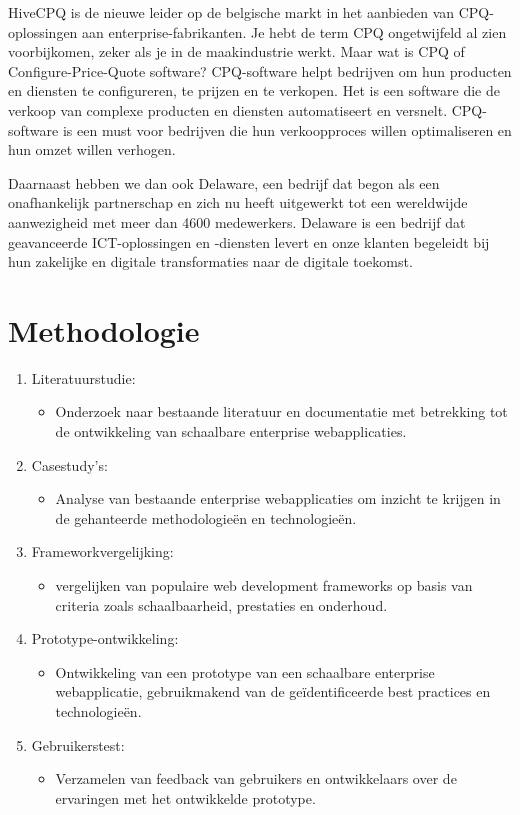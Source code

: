 \documentclass{hogent-article}
\begin{document}
HiveCPQ is de nieuwe leider op de belgische markt in het aanbieden van CPQ-oplossingen aan enterprise-fabrikanten. Je hebt de term CPQ ongetwijfeld al zien voorbijkomen, zeker als je in de maakindustrie werkt. Maar wat is CPQ of Configure-Price-Quote software? CPQ-software helpt bedrijven om hun producten en diensten te configureren, te prijzen en te verkopen. Het is een software die de verkoop van complexe producten en diensten automatiseert en versnelt. CPQ-software is een must voor bedrijven die hun verkoopproces willen optimaliseren en hun omzet willen verhogen. 

Daarnaast hebben we dan ook Delaware, een bedrijf dat begon als een onafhankelijk partnerschap en zich nu heeft uitgewerkt tot een wereldwijde aanwezigheid met meer dan 4600 medewerkers. Delaware is een bedrijf dat geavanceerde ICT-oplossingen en -diensten levert en onze klanten begeleidt bij hun zakelijke en digitale transformaties naar de digitale toekomst.

\section{Methodologie}
\begin{enumerate}
  \item Literatuurstudie: 
  \begin{itemize}
    \item Onderzoek naar bestaande literatuur en documentatie met betrekking tot de ontwikkeling van schaalbare enterprise webapplicaties.
  \end{itemize}
  \item Casestudy's: 
  \begin{itemize}
    \item Analyse van bestaande enterprise webapplicaties om inzicht te krijgen in de gehanteerde methodologieën en technologieën.
  \end{itemize}
  \item Frameworkvergelijking:
  \begin{itemize}
    \item vergelijken van populaire web development frameworks op basis van criteria zoals schaalbaarheid, prestaties en onderhoud.
  \end{itemize}
  \item Prototype-ontwikkeling: 
  \begin{itemize}
    \item Ontwikkeling van een prototype van een schaalbare enterprise webapplicatie, gebruikmakend van de geïdentificeerde best practices en technologieën.
  \end{itemize}
  \item Gebruikerstest:
  \begin{itemize}
    \item Verzamelen van feedback van gebruikers en ontwikkelaars over de ervaringen met het ontwikkelde prototype.
  \end{itemize}
\end{enumerate}
\end{document}
